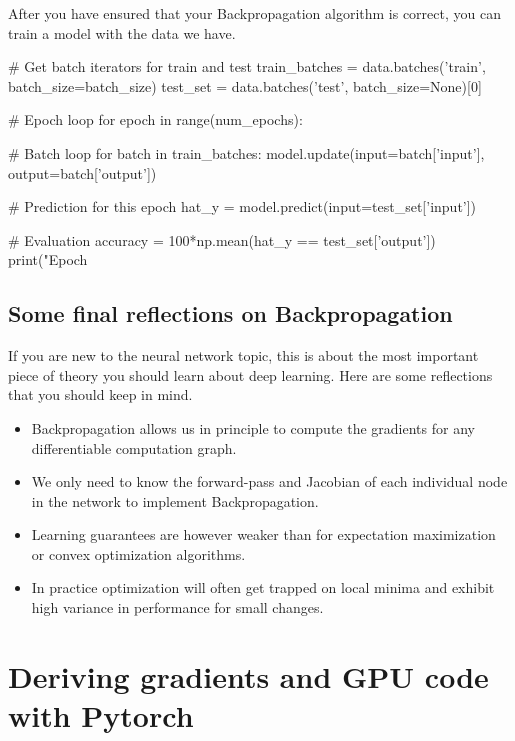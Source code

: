 \begin{exercise}
\noindent After you have ensured that your Backpropagation algorithm is correct, you can train a model with the data we have.

\begin{python}
# Get batch iterators for train and test
train_batches = data.batches('train', batch_size=batch_size)
test_set = data.batches('test', batch_size=None)[0]

# Epoch loop
for epoch in range(num_epochs):

    # Batch loop
    for batch in train_batches:
        model.update(input=batch['input'], output=batch['output'])

    # Prediction for this epoch
    hat_y = model.predict(input=test_set['input'])

    # Evaluation
    accuracy = 100*np.mean(hat_y == test_set['output'])
    print("Epoch %
\end{python}
\end{exercise}

\subsection{Some final reflections on Backpropagation}

If you are new to the neural network topic, this is about the most important
piece of theory you should learn about deep learning. Here are some reflections
that you should keep in mind.

\begin{itemize}
\item Backpropagation allows us in principle to compute the gradients for any differentiable computation graph.

\item We only need to know the forward-pass and Jacobian of each individual node in the network to implement Backpropagation.

\item Learning guarantees are however weaker than for expectation maximization or convex optimization algorithms.

\item In practice optimization will often get trapped on local minima and exhibit high variance in performance for small changes.
\end{itemize}

\section{Deriving gradients and GPU code with Pytorch}

